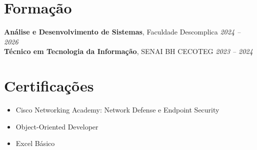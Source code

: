 \documentclass[11pt,a4paper]{article}
\begin{document}
\section{Formação}

\textbf{Análise e Desenvolvimento de Sistemas}, Faculdade Descomplica \hfill \textit{2024 -- 2026}\\
\textbf{Técnico em Tecnologia da Informação}, SENAI BH CECOTEG \hfill \textit{2023 -- 2024}

\section{Certificações}
\begin{itemize}
  \item Cisco Networking Academy: Network Defense e Endpoint Security
  \item Object-Oriented Developer
  \item Excel Básico
\end{itemize}
\end{document}
